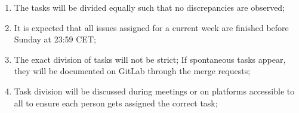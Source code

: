 \begin{enumerate}
\begin{enumerate}
\begin{enumerate}
    \end{enumerate}
    \item The tasks will be divided equally such that no discrepancies are observed;
    \item It is expected that all issues assigned for a current week are finished before Sunday at 23:59 CET;
    \item The exact division of tasks will not be strict; If spontaneous tasks appear, they will be documented on GitLab through the merge requests;
    \item Task division will be discussed during meetings or on platforms accessible to all to ensure each person gets assigned the correct task;
    \end{enumerate}
\end{enumerate}
\par